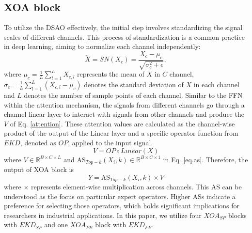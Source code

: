 \documentclass[lettersize,journal]{IEEEtran}
\begin{document}
\subsection{XOA block }
To utilize the DSAO effectively, the initial step involves standardizing the signal scales of different channels. This process of standardization is a common practice in deep learning, aiming to normalize each channel independently:
\begin{equation}
\tilde X = SN({X_c}) = \frac{{{X_c} - {\mu _c}}}{{\sqrt {\sigma _c^2 + \epsilon} }},
\end{equation}
where ${\mu _c} = \frac{1}{L}\sum\nolimits_{l = 1}^L {{X_{c,l}}} $ represents the mean of $X$ in $C$ channel, ${\sigma _c} = \frac{1}{L}\sum\nolimits_{l = 1}^L {({X_{c,l}- {\mu _c}})}$ denotes the standard deviation of $X$ in each channel and $L$ denotes the number of sample points of each channel.  Similar to the FFN within the attention mechanism, the signals from different channels go through a channel linear layer to interact with signals from other channels and produce the $V$ of Eq. \ref{attention}. These attention values are calculated as the channel-wise product of the output of the Linear layer and a specific operator function from $EKD$, denoted as $OP$, applied to the input signal.  
\begin{equation}
    V = OP \circ Linear(X)
\end{equation}
where $V \in \mathbb{R}^{B \times C \times L} $ and  $\text{AS}_{Top-k}(X_i, k) \in \mathbb{R}^{B \times C \times 1 }$  in Eq. \ref{eq.as}. Therefore, the output of XOA block is
\begin{equation}
    Y = \text{AS}_{Top-k}(X_i, k) \times  V
\end{equation}
where $\times$ represents element-wise multiplication across channels. This AS can be understood as the focus on particular expert operators. Higher ASs indicate a preference for selecting those operators, which holds significant implications for researchers in industrial applications. In this paper, we utilize four $XOA_{SP}$ blocks with  $EKD_{SP}$ and one $XOA_{FE}$ block with $EKD_{FE}$.
\end{document}
